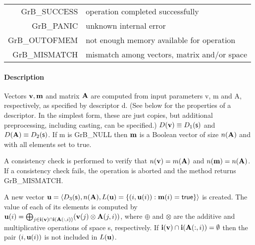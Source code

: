 \documentclass[11pt]{extarticle}
\begin{document}

\begin{tabular}{rl} 
{\sf GrB\_SUCCESS} 	& operation completed successfully \\
{\sf GrB\_PANIC}	& unknown internal error \\
{\sf GrB\_OUTOFMEM}	& not enough memory available for operation \\
{\sf GrB\_MISMATCH}	& mismatch among vectors, matrix and/or space
\end{tabular}


\paragraph{Description}

Vectors ${\bf v}, {\bf m}$ and matrix ${\bf A}$ are computed
from input parameters {\sf v}, {\sf m} and {\sf A}, respectively, as
specified by descriptor {\sf d}. (See below for the properties of a
descriptor. In the simplest form, these are just copies, but 
additional preprocessing, including casting, can be specified.)
$D({\bf v}) \equiv D_1({\sf s})$ and $D({\bf A}) \equiv D_2({\sf s})$.
If {\sf m} is {\sf GrB\_NULL} then
${\bf m}$ is a Boolean vector of size $n({\bf A})$ and with
all elements set to {\sf true}.  

A consistency check is performed
to verify that $n({\bf v}) = m({\bf A})$ and $n({\bf m}) =
n({\bf A})$. If a consistency check fails, the operation is aborted
and the method returns {\sf GrB\_MISMATCH}.

A new vector ${\bf u} = \langle D_3({\sf s}), n({\bf A}),
L({\bf u}) = \{(i,{\bf u}(i)) : {\bf m}(i) = {\sf true} \}
\rangle$ is created.  The value of each of its elements is computed
by ${\bf u}(i) = \bigoplus_{j \in {\bf i}({\bf v}) \cap
{\bf i}({\bf A}(:,i))} ({\bf v}(j) \otimes {\bf A}(j,i))$,
where $\oplus$ and $\otimes$ are the additive and multiplicative
operations of space {\sf s}, respectively.
If ${\bf i}({\bf v}) \cap {\bf i}({\bf A}(:,i)) = \emptyset$ then
the pair $(i,{\bf u}(i))$ is not included in $L({\bf u})$.
\end{document}

